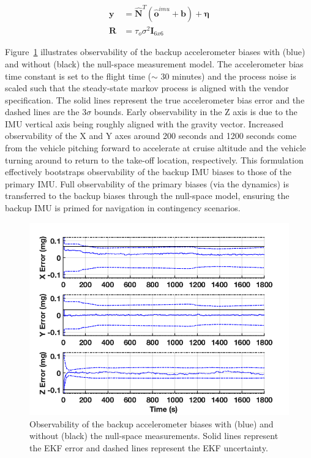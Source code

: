 \begin{equation}
\begin{aligned}
\bm{y} &= \hat{\bm{N}}^{T}\left(\hat{\bm{o}}^{imu} + \bm{b}\right) + \bm{\eta} \\ 
\bm{R} &= \tau_{o} \sigma^{2}\bm{I}_{6x6} 
\label{eq:null-space-meas-model}
\end{aligned}
\end{equation}

\noindent  Figure~\ref{fig:nullspace} illustrates observability of the backup accelerometer biases with (blue) and without (black) the null-space measurement model. The accelerometer bias time constant is set to the flight time ($\sim$ 30 minutes) and the process noise is scaled such that the steady-state markov process is aligned with the vendor specification. The solid lines represent the true accelerometer bias error and the dashed lines are the 3$\sigma$ bounds. Early observability in the Z axis is due to the \ac{IMU} vertical axis being roughly aligned with the gravity vector. Increased observability of the X and Y axes around 200 seconds and 1200 seconds come from the vehicle pitching forward to accelerate at cruise altitude and the vehicle turning around to return to the take-off location, respectively. This formulation effectively bootstraps observability of the backup \ac{IMU} biases to those of the primary \ac{IMU}. Full observability of the primary biases (via the dynamics) is transferred to the backup biases through the null-space model, ensuring the backup \ac{IMU} is primed for navigation in contingency scenarios. 

\begin{figure}[htb]
	\centering\includegraphics[width=5.5in]{content/figures/nullspace_results.png}
	\caption{Observability of the backup accelerometer biases with (blue) and without (black) the null-space measurements. Solid lines represent the EKF error and dashed lines represent the EKF uncertainty.}
	\label{fig:nullspace}
\end{figure}

